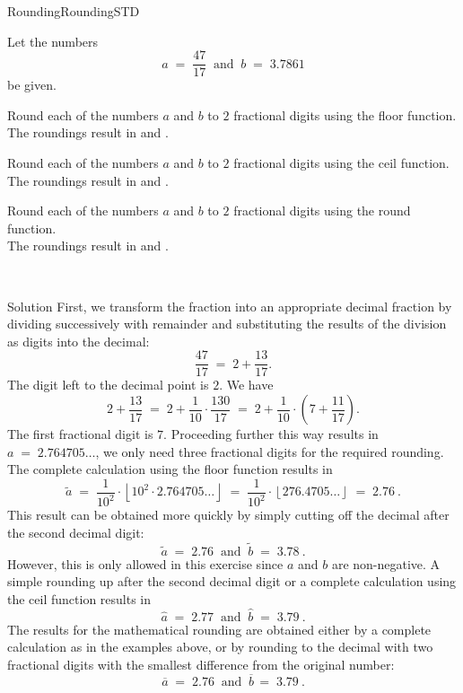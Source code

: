 \begin{MXContent}{Rounding}{Rounding}{STD}
\begin{MExercise}
Let the numbers 
$$
a\; =\; \frac{47}{17} \;\;\text{and}\;\;  b\; =\; 3.7861
$$
be given.
\begin{MExerciseItems}
\item{Round each of the numbers $a$ and $b$ to $2$ fractional digits using the \textsf{floor} function.\\The roundings result in
 and .}
\item{Round each of the numbers $a$ and $b$ to $2$ fractional digits using the \textsf{ceil} function.\\The roundings result in
 and .}
\item{Round each of the numbers $a$ and $b$ to $2$ fractional digits using the \textsf{round} function.\\The roundings result in
 and .}
\end{MExerciseItems}
\ \\
\begin{MHint}{Solution}
First, we transform the fraction into an appropriate decimal fraction by dividing successively with remainder
and substituting the results of the division as digits into the decimal:
$$
\frac{47}{17} \;=\; 2+\frac{13}{17}.
$$
The digit left to the decimal point is $2$. We have
$$
2+\frac{13}{17} \;=\; 2+\frac1{10}\cdot \frac{130}{17} \;=\; 2+\frac1{10}\cdot\left({7+\frac{11}{17}}\right).
$$
The first fractional digit is $7$. Proceeding further this way results in $a\;=\;  2.764705\ldots$, 
we only need three fractional digits for the required rounding. The complete calculation using the 
\textsf{floor} function results in
$$
\tilde a \;=\; \frac1{10^2}\cdot \left\lfloor{ 10^2\cdot 2.764705\ldots}\right\rfloor \;=\; \frac1{10^2}\cdot \left\lfloor{ 276.4705\ldots}\right\rfloor \;=\;  2.76\: .
$$
This result can be obtained more quickly by simply cutting off the decimal after the second decimal digit:
$$
\tilde a \;=\; 2.76\;\; \text{and}\;\; \tilde b \;=\; 3.78\: .
$$
However, this is only allowed in this exercise since $a$ and $b$ are non-negative. 
A simple rounding up after the second decimal digit or a complete calculation using the \textsf{ceil} function 
results in
$$
\hat a \;=\; 2.77\;\; \text{and}\;\; \hat b \;=\; 3.79\: .
$$
The results for the mathematical rounding are obtained either by a complete calculation as in the examples above, or 
by rounding to the decimal with two fractional digits with the smallest difference from the original number:
$$
\overline{a} \; = \; 2.76 \;\; \text{and}\;\; \overline{b} \,=\; 3.79\: .
$$
\end{MHint}
\end{MExercise}

\end{MXContent}

